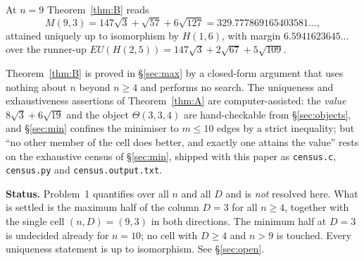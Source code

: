 \documentclass[11pt]{amsart}
\theoremstyle{remark}
\newcommand{\EU}{\mathit{EU}}
\begin{document}
At $n=9$ Theorem~\ref{thm:B} reads
\[
 M(9,3)=147\sqrt3+\sqrt{57}+6\sqrt{127}=329.777869165403581\ldots,
\]
attained uniquely up to isomorphism by $H(1,6)$, with margin
$6.5941623645\ldots$ over the runner-up
$\EU(H(2,5))=147\sqrt3+2\sqrt{67}+5\sqrt{109}$.

Theorem~\ref{thm:B} is proved in \S\ref{sec:max} by a closed-form argument that
uses nothing about $n$ beyond $n\ge4$ and performs no search. The uniqueness
and exhaustiveness assertions of Theorem~\ref{thm:A} are computer-assisted: the
\emph{value} $8\sqrt3+6\sqrt{19}$ and the object $\Theta(3,3,4)$ are
hand-checkable from \S\ref{sec:objects}, and \S\ref{sec:min} confines the
minimiser to $m\le10$ edges by a strict inequality; but ``no other member of
the cell does better, and exactly one attains the value'' rests on the
exhaustive census of \S\ref{sec:min}, shipped with this paper as
\texttt{census.c}, \texttt{census.py} and \texttt{census.output.txt}.

\medskip
\noindent\textbf{Status.} Problem~1 quantifies
over all $n$ and all $D$ and is \emph{not} resolved here. What is settled is
the maximum half of the column $D=3$ for all $n\ge4$, together with the single
cell $(n,D)=(9,3)$ in both directions. The minimum half at $D=3$ is undecided
already for $n=10$; no cell with $D\ge4$ and $n>9$ is touched. Every uniqueness
statement is up to isomorphism. See \S\ref{sec:open}.
\end{document}
